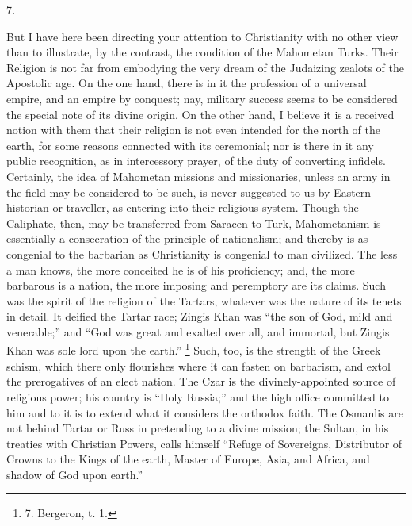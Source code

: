7.

But I have here been directing
your attention to Christianity with no other view than to illustrate,
by the contrast, the condition of the Mahometan Turks. Their Religion
is not far from embodying the very dream of the Judaizing zealots of
the Apostolic age. On the one hand, there is in it the profession of a
universal empire, and an empire by conquest; nay, military success
seems to be considered the special note of its divine origin. On the
other hand, I believe it is a received notion with them that their
religion is not even intended for the north of the earth, for some
reasons connected with its ceremonial; nor is there in it any public
recognition, as in intercessory prayer, of the duty of converting
infidels. Certainly, the idea of Mahometan missions and missionaries,
unless an army in the field may be considered to be such, is never
suggested to us by Eastern historian or traveller, as entering into
their religious system. Though the Caliphate, then, may be transferred
from Saracen to Turk, Mahometanism is essentially a consecration of
the principle of nationalism; and thereby is as congenial to the
barbarian as Christianity is congenial to man civilized. The less a
man knows, the more conceited he is of his proficiency; and, the more
barbarous is a nation, the more imposing and peremptory are its
claims. Such was the spirit of the religion of the Tartars, whatever
was the nature of its tenets in detail. It deified the Tartar race;
Zingis Khan was ``the son of God, mild and venerable;'' and ``God was
great and exalted over all, and immortal, but Zingis Khan was sole
lord upon the earth.'' \footnote{7.
Bergeron, t. 1.}
Such, too, is the strength of the Greek schism, which there only
flourishes where it can fasten on barbarism, and extol the
prerogatives of an elect nation. The Czar is the divinely-appointed
source of religious power; his country is ``Holy Russia;'' and the high
office committed to him and to it is to extend what it considers the
orthodox faith. The Osmanlis are not behind Tartar or Russ in
pretending to a divine mission; the Sultan, in his treaties with
Christian Powers, calls himself ``Refuge of Sovereigns, Distributor of
Crowns to the Kings of the earth, Master of Europe, Asia, and Africa,
and shadow of God upon earth.''

